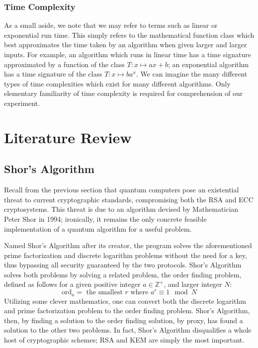 \documentclass[a4paper]{article}
\begin{document}
\subsubsection[timecomplex]{Time Complexity}
As a small aside, we note that we may refer to terms such as linear or exponential
run time. This simply refers to the mathematical function class which
best approximates the time taken by an algorithm when given larger and
larger inputs. For example, an algorithm which runs in linear time has a
time signature approximated by a function of the class
\(T: x \mapsto ax + b\); an exponential algorithm has a time signature
of the class \(T: x \mapsto ba^x\). We can imagine the many different
types of time complexities which exist for many different algorithms.
Only elementary familiarity of time complexity is required for
comprehension of our experiment.

\section{Literature Review}\label{literature-review}

\subsection{Shor's Algorithm}\label{shors-algorithm}

Recall from the previous section that quantum computers pose an
existential threat to current cryptographic standards, compromising both
the RSA and ECC cryptosystems. This threat is due to an algorithm
devised by Mathematician Peter Shor in 1994; ironically, it remains the
only concrete feasible implementation of a quantum algorithm for a
useful problem.

Named Shor's Algorithm after its creator, the program solves the
aforementioned prime factorization and discrete logarithm problems
without the need for a key, thus bypassing all security guaranteed by
the two protocols. Shor's Algorithm solves both problems by solving a
related problem, the order finding problem, defined as follows for a
given positive integer \(a \in \mathbb{Z}^+\), and larger integer \(N\):
\[ \text{ord}_a = \text{ the smallest } r \text { where } a^r \equiv 1 \mod{N}\]
Utilizing some clever mathematics, one can convert both the discrete
logarithm and prime factorization problem to the order finding problem.
Shor's Algorithm, then, by finding a solution to the order finding
solution, by proxy, has found a solution to the other two problems. In
fact, Shor's Algorithm disqualifies a whole host of cryptographic
schemes; RSA and KEM are simply the most important.
\end{document}
